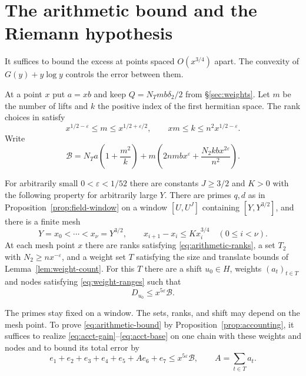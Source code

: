 \section{The arithmetic bound and the Riemann hypothesis}\label{sec:arithmetic-bound}

It suffices to bound the excess at points spaced $O(x^{3/4})$ apart.
The convexity of $G(y)+y\log y$ controls the error between them.

At a point $x$ put $a=xb$ and keep $Q=N_Tmb\delta_2/2$ from
\S\ref{sec:weights}. Let $m$ be the number of lifts and $k$ the
positive index of the first hermitian space. The rank choices in
\citep[Proposition~5.15]{adriazola-grh} satisfy
\begin{equation}\label{eq:arithmetic-ranks}
  x^{1/2-\varepsilon}\le m\le x^{1/2+\varepsilon/2},
  \qquad xm\le k\le n^2x^{1/2-\varepsilon}.
\end{equation}
Write
\[
  \mathcal B=N_Ta\left(1+\frac{m^2}{k}\right)
       +m\left(2nmbx^\varepsilon+\frac{N_2kb x^{2\varepsilon}}{n^2}\right).
\]

\begin{hypothesis}[\openinput]\label{hyp:one-shift-arithmetic}
For arbitrarily small $0<\varepsilon<1/52$ there are constants
$J\ge3/2$ and $K>0$ with the following property for arbitrarily
large $Y$. There are primes $q,d$ as in
Proposition~\ref{prop:field-window} on a window $[U,U^J]$ containing
$[Y,Y^{3/2}]$, and there is a finite mesh
\[
  Y=x_0<\cdots<x_\nu=Y^{3/2},\qquad
  x_{i+1}-x_i\le Kx_i^{3/4}\quad(0\le i<\nu).
\]
At each mesh point $x$ there are ranks satisfying
\eqref{eq:arithmetic-ranks}, a set $T_2$ with $N_2\ge nx^{-\varepsilon}$,
and a weight set $T$ satisfying the size and translate bounds of
Lemma~\ref{lem:weight-count}. For this $T$ there are a shift $u_0\in H$,
weights $(a_t)_{t\in T}$ and nodes satisfying \eqref{eq:weight-ranges}
such that
\begin{equation}\label{eq:arithmetic-bound}
  D_{u_0}\le x^{5\varepsilon}\mathcal B .
\end{equation}
\end{hypothesis}

The primes stay fixed on a window. The sets, ranks, and shift may
depend on the mesh point. To prove \eqref{eq:arithmetic-bound} by
Proposition~\ref{prop:accounting}, it suffices to realize
\eqref{eq:acct-gain}--\eqref{eq:acct-base} on one chain with these
weights and nodes and to bound its total error by
\[
  e_1+e_2+e_3+e_4+e_5+A e_6+e_7\le x^{5\varepsilon}\mathcal B,
  \qquad A=\sum_{t\in T}a_t .
\]

